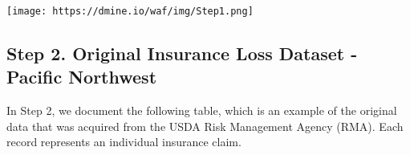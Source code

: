 \documentclass[]{article}
\newenvironment{Shaded}{\begin{snugshade}}{\end{snugshade}}
\newcommand{\DataTypeTok}[1]{\textcolor[rgb]{0.13,0.29,0.53}{#1}}
\newcommand{\DecValTok}[1]{\textcolor[rgb]{0.00,0.00,0.81}{#1}}
\newcommand{\KeywordTok}[1]{\textcolor[rgb]{0.13,0.29,0.53}{\textbf{#1}}}
\newcommand{\NormalTok}[1]{#1}
\newcommand{\OperatorTok}[1]{\textcolor[rgb]{0.81,0.36,0.00}{\textbf{#1}}}
\newcommand{\StringTok}[1]{\textcolor[rgb]{0.31,0.60,0.02}{#1}}
\begin{document}
\texttt{[image: https://dmine.io/waf/img/Step1.png]}

\hypertarget{step-2.-original-insurance-loss-dataset---pacific-northwest}{%
\subsection{Step 2. Original Insurance Loss Dataset - Pacific
Northwest}\label{step-2.-original-insurance-loss-dataset---pacific-northwest}}

In Step 2, we document the following table, which is an example of the
original data that was acquired from the USDA Risk Management Agency
(RMA). Each record represents an individual insurance claim.

\begin{Shaded}
\end{Shaded}
\end{document}
